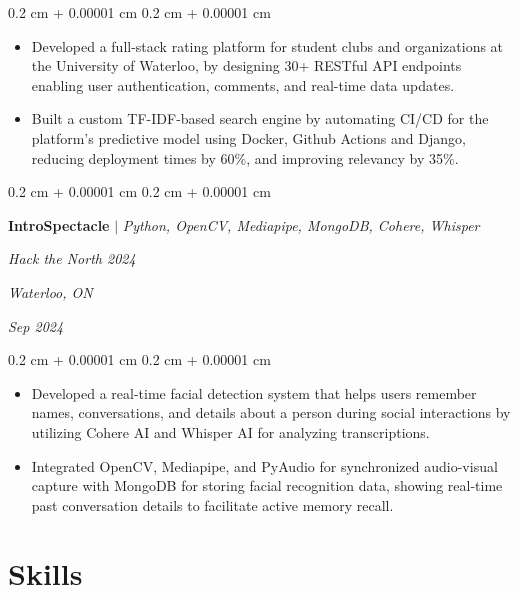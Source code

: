 \documentclass[10pt, letterpaper]{article}
\newenvironment{highlights}{
    \begin{itemize}[
        topsep=0.10 cm,
        parsep=0.10 cm,
        partopsep=0pt,
        itemsep=0pt,
        leftmargin=0.4 cm + 10pt
    ]
}{
    \end{itemize}
} %
\newenvironment{onecolentry}{
    \begin{adjustwidth}{
        0.2 cm + 0.00001 cm
    }{
        0.2 cm + 0.00001 cm
    }
}{
    \end{adjustwidth}
} %
\newenvironment{twocolentry}[2][]{
    \onecolentry
    \def\secondColumn{#2}
    \setcolumnwidth{\fill, 4.5 cm}
    \begin{paracol}{2}
}{
    \switchcolumn \raggedleft \secondColumn
    \end{paracol}
    \endonecolentry
} %
\let\hrefWithoutArrow\href
\renewcommand{\href}[2]{\hrefWithoutArrow{#1}{\ifthenelse{\equal{#2}{}}{ }{#2 }\raisebox{.15ex}{\footnotesize \faExternalLink*}}}
\begin{document}
        \vspace{0.10 cm}
        \begin{onecolentry}
            \begin{highlights}
                \item Developed a full-stack rating platform for student clubs and organizations at the University of Waterloo, by
designing 30+ RESTful API endpoints enabling user authentication, comments, and real-time data updates.
                \item Built a custom TF-IDF-based search engine by automating CI/CD for the platform's predictive model using Docker, Github Actions and Django, reducing deployment times by 60\%, and improving relevancy by 35\%.
                
            \end{highlights}
        \end{onecolentry}

        \vspace{0.2 cm}

       \begin{twocolentry}{
         \textit{Waterloo, ON}    
            
        \textit{Sep 2024}}
            \textbf{\textbf{IntroSpectacle }}\mbox{\hrefWithoutArrow{https://github.com/vinny-nguyen/IntroSpectacle}{\color{black}{\footnotesize\faGithub}}}
            $|$ \emph{Python, OpenCV, Mediapipe, MongoDB, Cohere, Whisper}
            
            \textit{Hack the North 2024}
        \end{twocolentry}
        
        \vspace{0.10 cm}
        \begin{onecolentry}
            \begin{highlights}
                \item Developed a real-time facial detection system that helps users remember names, conversations, and details about a person during social interactions by utilizing Cohere AI and Whisper AI for analyzing transcriptions.
                \item Integrated OpenCV, Mediapipe, and PyAudio for synchronized audio-visual capture with MongoDB for storing facial
recognition data, showing real-time past conversation details to facilitate active memory recall.
            \end{highlights}
        \end{onecolentry}
    \section{Skills}
\end{document}
